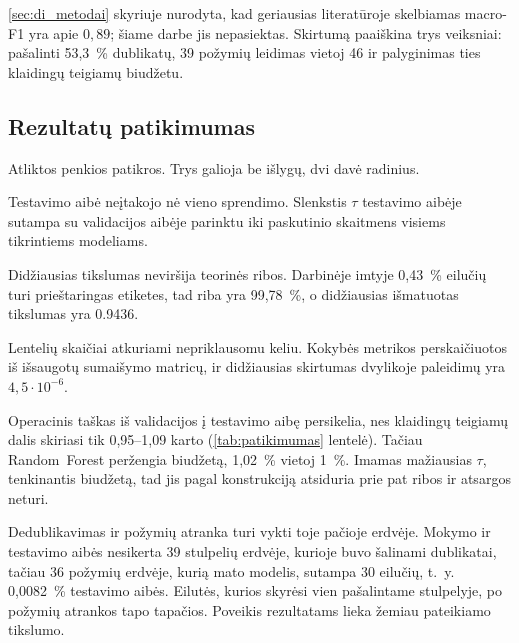 \ref{sec:di_metodai} skyriuje nurodyta, kad geriausias literatūroje
skelbiamas macro-F1 yra apie $0{,}89$; šiame darbe jis nepasiektas.
Skirtumą paaiškina trys veiksniai: pašalinti 53,3~\% dublikatų,
39 požymių leidimas vietoj 46 ir palyginimas ties klaidingų teigiamų
biudžetu.


\subsection{Rezultatų patikimumas}
\label{sec:patikimumas}

Atliktos penkios patikros. Trys galioja be išlygų, dvi davė radinius.

Testavimo aibė neįtakojo nė vieno sprendimo. Slenkstis $\tau$ testavimo
aibėje sutampa su validacijos aibėje parinktu iki paskutinio skaitmens
visiems tikrintiems modeliams.

Didžiausias tikslumas neviršija teorinės ribos. Darbinėje imtyje 0,43~\%
eilučių turi prieštaringas etiketes, tad riba yra 99,78~\%, o didžiausias
išmatuotas tikslumas yra \num{0.9436}.

Lentelių skaičiai atkuriami nepriklausomu keliu. Kokybės metrikos
perskaičiuotos iš išsaugotų sumaišymo matricų, ir didžiausias
skirtumas dvylikoje paleidimų yra $4{,}5 \cdot 10^{-6}$.

\begin{table}[htbp]
\centering
\caption{Operacinio taško perkeliamumas iš validacijos į testavimo aibę.}
\label{tab:patikimumas}
\end{table}

Operacinis taškas iš validacijos į testavimo aibę persikelia, nes
klaidingų teigiamų dalis skiriasi tik 0,95--1,09 karto
(\ref{tab:patikimumas} lentelė). Tačiau Random~Forest peržengia
biudžetą, 1,02~\% vietoj 1~\%. Imamas mažiausias $\tau$, tenkinantis
biudžetą, tad jis pagal konstrukciją atsiduria prie pat ribos ir
atsargos neturi.

Dedublikavimas ir požymių atranka turi vykti toje pačioje erdvėje.
Mokymo ir testavimo aibės nesikerta 39 stulpelių erdvėje, kurioje buvo
šalinami dublikatai, tačiau 36 požymių erdvėje, kurią mato modelis,
sutampa \num{30} eilučių, t.~y. 0,0082~\% testavimo aibės. Eilutės,
kurios skyrėsi vien pašalintame stulpelyje, po požymių atrankos tapo
tapačios. Poveikis rezultatams lieka žemiau pateikiamo tikslumo.
